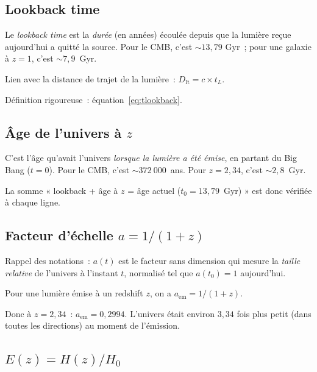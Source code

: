 \documentclass[11pt,a4paper,openany]{report}
\newcommand{\Hzero}{H_{0}}
\begin{document}
\subsection{Lookback time}

\begin{tcolorbox}[gui]
Le \emph{lookback time} est la \emph{durée} (en années) écoulée depuis que la
lumière reçue aujourd'hui a quitté la source. Pour le CMB, c'est $\sim 13{,}79$
Gyr~; pour une galaxie à $z=1$, c'est $\sim 7{,}9$~Gyr.

\medskip
Lien avec la distance de trajet de la lumière~: $D_{\text{lt}} = c \times
t_L$.

\medskip
Définition rigoureuse~: équation~\eqref{eq:tlookback}.
\end{tcolorbox}

\subsection{Âge de l'univers à $z$}

\begin{tcolorbox}[gui]
C'est l'âge qu'avait l'univers \emph{lorsque la lumière a été émise}, en partant
du Big Bang ($t=0$). Pour le CMB, c'est $\sim 372~000$~ans. Pour
$z=2{,}34$, c'est $\sim 2{,}8$~Gyr.

\medskip
La somme « lookback + âge à $z$ = âge actuel ($t_0 = 13{,}79$~Gyr) »
est donc vérifiée à chaque ligne.
\end{tcolorbox}

\subsection{Facteur d'échelle $a = 1/(1+z)$}

\begin{tcolorbox}[gui]
Rappel des notations~: $a(t)$ est le facteur sans dimension qui mesure la
\emph{taille relative} de l'univers à l'instant $t$, normalisé tel que
$a(t_0) = 1$ aujourd'hui.

\medskip
Pour une lumière émise à un redshift $z$, on a $a_{\text{em}} = 1/(1+z)$.

\medskip
Donc à $z = 2{,}34$~: $a_{\text{em}} = 0{,}2994$. L'univers était environ
$3{,}34$ fois plus petit (dans toutes les directions) au moment de l'émission.
\end{tcolorbox}

\subsection{$E(z) = H(z)/\Hzero$}
\end{document}
